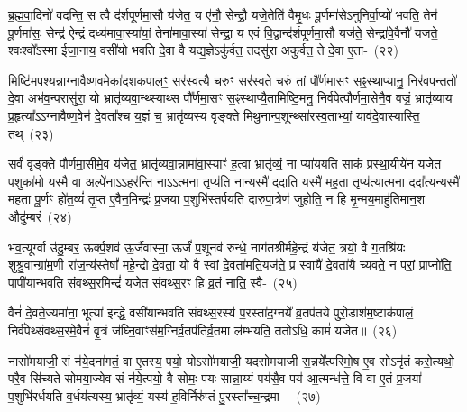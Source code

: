 {}

ब्र॒ह्म॒वा॒दिनो॑ वदन्ति॒ स त्वै द॑र्\mbox{}शपूर्णमा॒सौ य॑जेत॒ य ए॑नौ॒ सेन्द्रौ॒ यजे॒तेति॑ वैमृ॒धः पू॒र्णमा॑से\-ऽनुनिर्वा॒प्यो॑ भवति॒ तेन॑ पू॒र्णमा॑सः॒ सेन्द्र॑ ऐ॒न्द्रं दध्य॑मावा॒स्या॑यां॒ तेना॑मावा॒स्या॑ सेन्द्रा॒ य ए॒वं वि॒द्वान्द॑र्\mbox{}शपूर्णमा॒सौ यज॑ते॒ सेन्द्रा॑वे॒वैनौ॑ यजते॒ श्वःश्वो᳚\-ऽस्मा ईजा॒नाय॒ वसी॑यो भवति दे॒वा वै यद्य॒ज्ञे\-ऽकु॑र्वत॒ तदसु॑रा अकुर्वत॒ ते दे॒वा ए॒ता-~(२२)\ip

मिष्टि॑मपश्यन्नाग्नावैष्ण॒वमेका॑\-दश\-कपाल॒ꣳ॒ सर॑स्वत्यै च॒रुꣳ सर॑स्वते च॒रुं तां पौ᳚र्णमा॒सꣳ स॒ꣴ॒स्थाप्यानु॒ निर॑वप॒न्ततो॑ दे॒वा अभ॑व॒न्परासु॑रा॒ यो भ्रातृ॑व्यवा॒न्थ्स्याथ्स पौ᳚र्णमा॒सꣳ स॒ꣴ॒स्थाप्यै॒तामिष्टि॒मनु॒ निर्व॑पेत्पौर्णमा॒सेनै॒व वज्रं॒ भ्रातृ॑व्याय प्र॒हृत्या᳚\-ऽऽ\-ग्नावैष्ण॒वेन॑ दे॒वता᳚श्च य॒ज्ञं च॒ भ्रातृ॑व्यस्य वृङ्क्ते मिथु॒नान्प॒शून्थ्सा॑\-रस्व॒ताभ्यां॒ याव॑दे॒वास्यास्ति॒ तथ्~(२३)\ip

सर्वं॑ वृङ्क्ते पौर्णमा॒सीमे॒व य॑जेत॒ भ्रातृ॑व्यवा॒न्नामा॑वा॒स्याꣳ॑ ह॒त्वा भ्रातृ॑व्यं॒ ना प्या॑ययति साकं प्रस्था॒यीये॑न यजेत प॒शुका॑मो॒ यस्मै॒ वा अल्पे॑ना॒\-ऽऽ\-हर॑न्ति॒ ना\-ऽऽ\-त्मना॒ तृप्य॑ति॒ नान्यस्मै॑ ददाति॒ यस्मै॑ मह॒ता तृप्य॑त्या॒त्मना॒ ददा᳚त्य॒न्यस्मै॑ मह॒ता पू॒र्णꣳ हो॑त॒व्यं॑ तृ॒प्त ए॒वैन॒मिन्द्रः॑ प्र॒जया॑ प॒शुभि॑स्तर्पयति दारुपा॒त्रेण॑ जुहोति॒ न हि मृ॒न्मय॒माहु॑तिमान॒श औदु॑म्बरं~(२४)\ip

भव॒त्यूर्ग्वा उ॑दु॒म्बर॒ ऊर्क्प॒शव॑ ऊ॒र्जैवास्मा॒ ऊर्जं॑ प॒शूनव॑ रुन्धे॒ नाग॑तश्रीर्महे॒न्द्रं य॑जेत॒ त्रयो॒ वै ग॒तश्रि॑यः शुश्रु॒वान्ग्रा॑म॒णी रा॑ज॒न्य॑स्तेषां᳚ महे॒न्द्रो दे॒वता॒ यो वै स्वां दे॒वता॑मति॒यज॑ते॒ प्र स्वायै॑ दे॒वता॑यै च्यवते॒ न परां॒ प्राप्नो॑ति॒ पापी॑यान्भवति संवथ्स॒रमिन्द्रं॑ यजेत संवथ्स॒रꣳ हि व्र॒तं नाति॒ स्वै-~(२५)\ip

वैनं॑ दे॒वते॒ज्यमा॑ना॒ भूत्या॑ इन्द्धे॒ वसी॑यान्भवति संवथ्स॒रस्य॑ प॒रस्ता॑\-द॒ग्नये᳚ व्र॒तप॑तये पुरो॒डाश॑\-म॒ष्टा\-क॑पालं॒ निर्व॑पेथ्संवथ्स॒रमे॒वैनं॑ वृ॒त्रं ज॑घ्नि॒वाꣳस॑म॒ग्निर्व्र॒तप॑तिर्व्र॒तमा ल॑म्भयति॒ ततो\-ऽधि॒ कामं॑ यजेत॥~(२६)\ip

{\anuvakamend[{ए॒तान्तदौदु॑म्बर॒ꣴ॒ स्वा त्रि॒ꣳ॒शच्च॑}]}

नासो॑मयाजी॒ सं न॑ये॒दना॑गतं॒ वा ए॒तस्य॒ पयो॒ यो\-ऽसो॑मयाजी॒ यदसो॑मयाजी स॒न्नये᳚त्परिमो॒ष ए॒व सो\-ऽनृ॑तं करो॒त्यथो॒ परै॒व सि॑च्यते सोमया॒ज्ये॑व सं न॑ये॒त्पयो॒ वै सोमः॒ पयः॑ सान्ना॒य्यं पय॑सै॒व पय॑ आ॒त्मन्ध॑त्ते॒ वि वा ए॒तं प्र॒जया॑ प॒शुभि॑रर्धयति व॒र्धय॑त्यस्य॒ भ्रातृ॑व्यं॒ यस्य॑ ह॒विर्निरु॑प्तं पु॒रस्ता᳚च्च॒न्द्रमा॑~-~(२७)\ip

